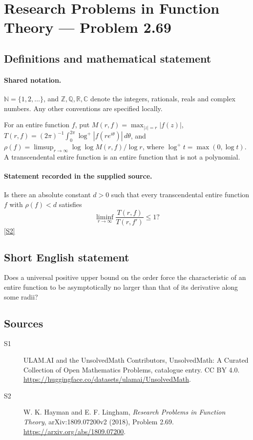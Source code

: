 \documentclass[11pt]{article}
\newcommand{\sref}[2]{\hyperlink{source:#1:#2}{[S#2]}}
\begin{document}
\section{Research Problems in Function Theory — Problem 2.69}\label{statement}

\subsection{Definitions and mathematical statement}

\paragraph{Shared notation.}$\mathbb N=\{1,2,\ldots\}$, and $\mathbb Z,\mathbb Q,\mathbb R,\mathbb C$ denote the integers, rationals, reals and complex numbers. Any other conventions are specified locally.


For an entire function $f$, put $M(r,f)=\max_{|z|=r}|f(z)|$, $T(r,f)=(2\pi)^{-1}\int_0^{2\pi}\log^+|f(re^{i\theta})|\,d\theta$, and $\rho(f)=\limsup_{r\to\infty}\log\log M(r,f)/\log r$, where $\log^+t=\max(0,\log t)$. A transcendental entire function is an entire function that is not a polynomial.
\paragraph{Statement recorded in the supplied source.}
Is there an absolute constant $d>0$ such that every transcendental entire function $f$ with $\rho(f)<d$ satisfies
\[\liminf_{r\to\infty}\frac{T(r,f)}{T(r,f')}\leq1?\] \sref{statement}{2}
\subsection{Short English statement}
Does a universal positive upper bound on the order force the characteristic of an entire function to be asymptotically no larger than that of its derivative along some radii?
\subsection{Sources}
\begin{description}
\item[\hypertarget{source:statement:1}{S1}] ULAM.AI and the UnsolvedMath Contributors, UnsolvedMath: A Curated Collection of Open Mathematics Problems, catalogue entry. CC BY 4.0. \url{https://huggingface.co/datasets/ulamai/UnsolvedMath}.
\item[\hypertarget{source:statement:2}{S2}] W. K. Hayman and E. F. Lingham, \emph{Research Problems in Function Theory}, arXiv:1809.07200v2 (2018), Problem 2.69. \url{https://arxiv.org/abs/1809.07200}.
\end{description}
\label{end:statement}
\end{document}
